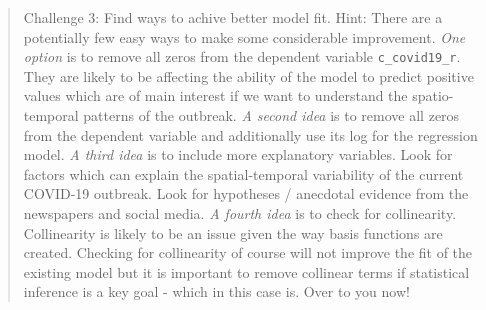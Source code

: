 \documentclass[
]{book}
\begin{document}
\begin{quote}
Challenge 3: Find ways to achive better model fit. Hint: There are a potentially few easy ways to make some considerable improvement.
\emph{One option} is to remove all zeros from the dependent variable \texttt{c\_covid19\_r}. They are likely to be affecting the ability of the model to predict positive values which are of main interest if we want to understand the spatio-temporal patterns of the outbreak.
\emph{A second idea} is to remove all zeros from the dependent variable and additionally use its log for the regression model.
\emph{A third idea} is to include more explanatory variables. Look for factors which can explain the spatial-temporal variability of the current COVID-19 outbreak. Look for hypotheses / anecdotal evidence from the newspapers and social media.
\emph{A fourth idea} is to check for collinearity. Collinearity is likely to be an issue given the way basis functions are created. Checking for collinearity of course will not improve the fit of the existing model but it is important to remove collinear terms if statistical inference is a key goal - which in this case is. Over to you now!
\end{quote}

  
\end{document}
